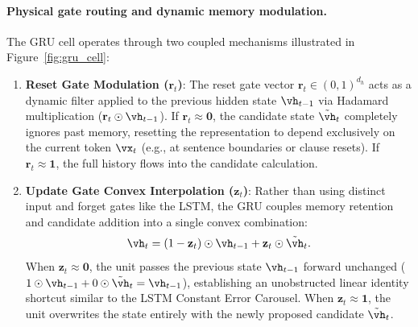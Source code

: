 \documentclass[../../main.tex]{subfiles}
\begin{document}
\paragraph{Physical gate routing and dynamic memory modulation.}
The GRU cell operates through two coupled mechanisms illustrated in Figure~\ref{fig:gru_cell}:
\begin{enumerate}
    \item \textbf{Reset Gate Modulation ($\mathbf{r}_t$)}: The reset gate vector $\mathbf{r}_t \in (0, 1)^{d_h}$ acts as a dynamic filter applied to the previous hidden state $\vh_{t-1}$ via Hadamard multiplication ($\mathbf{r}_t \odot \vh_{t-1}$). If $\mathbf{r}_t \approx \mathbf{0}$, the candidate state $\tilde{\vh}_t$ completely ignores past memory, resetting the representation to depend exclusively on the current token $\vx_t$ (e.g., at sentence boundaries or clause resets). If $\mathbf{r}_t \approx \mathbf{1}$, the full history flows into the candidate calculation.
    \item \textbf{Update Gate Convex Interpolation ($\mathbf{z}_t$)}: Rather than using distinct input and forget gates like the LSTM, the GRU couples memory retention and candidate addition into a single convex combination:
    \[
    \vh_t = (1 - \mathbf{z}_t) \odot \vh_{t-1} + \mathbf{z}_t \odot \tilde{\vh}_t.
    \]
    When $\mathbf{z}_t \approx \mathbf{0}$, the unit passes the previous state $\vh_{t-1}$ forward unchanged ($1 \odot \vh_{t-1} + 0 \odot \tilde{\vh}_t = \vh_{t-1}$), establishing an unobstructed linear identity shortcut similar to the LSTM Constant Error Carousel. When $\mathbf{z}_t \approx \mathbf{1}$, the unit overwrites the state entirely with the newly proposed candidate $\tilde{\vh}_t$.
\end{enumerate}
\end{document}
